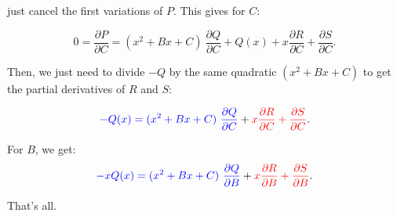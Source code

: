 \documentclass[11pt]{amsart}
\begin{document}
just cancel the first variations of $P$. This gives for $C$:

$$0 = \frac{\partial P}{\partial C}= (x^2+Bx+C)\ \frac{\partial
Q}{\partial C}+ Q(x) +x \frac{\partial R}{\partial C}+\frac{\partial
S}{\partial C}. $$

Then, we just need to divide $-Q$ by the same quadratic $(x^2+Bx+C)$ to get the
partial derivatives of $R$ and $S$:

$$\textcolor{blue}{-Q(x)=(x^2+Bx+C)\ \frac{\partial Q}{\partial C}}+\textcolor{red}{x \frac{\partial R}{\partial C}+\frac{\partial
S}{\partial C}} .$$

For $B$, we get:
$$\textcolor{blue}{-xQ(x)=(x^2+Bx+C)\ \frac{\partial Q}{\partial B}}+
\textcolor{red}{x \frac{\partial R}{\partial B}+\frac{\partial
S}{\partial B} }.$$

That's all.


  
\end{document}
